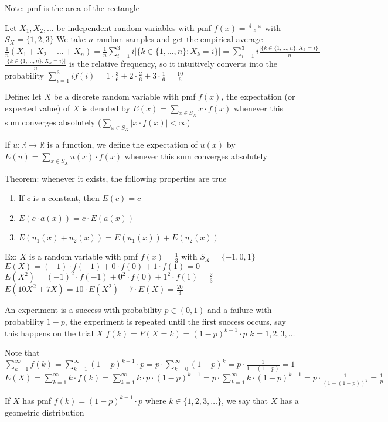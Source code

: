 \documentclass{article}
\begin{document}
Note: pmf is the area of the rectangle

Let $X_1,X_2,\dots$ be independent random variables with pmf $f(x)=\frac{4-x}{6}$ with $S_X=\{1,2,3\}$
We take $n$ random samples and get the empirical average $\frac{1}{n}(X_1+X_2+\dots+X_n)=\frac{1}{n}\sum_{i=1}^3i\lvert\{k\in\{1,\dots,n\}:X_k=i\}\rvert=\sum_{i=1}^3i\frac{\lvert\{k\in\{1,\dots,n\}:X_k=i\}\rvert}{n}$
$\frac{\lvert\{k\in\{1,\dots,n\}:X_k=i\}\rvert}{n}$ is the relative frequency, so it intuitively converts into the probability
$\sum_{i=1}^3if(i)=1\cdot\frac{3}{6}+2\cdot\frac{2}{6}+3\cdot\frac{1}{6}=\frac{10}{6}$

Define: let $X$ be a discrete random variable with pmf $f(x)$, the expectation (or expected value) of $X$ is denoted by $E(x)=\sum_{x\in S_X}x\cdot f(x)$ whenever this sum converges absolutely ($\sum_{x\in S_X}\lvert x\cdot f(x)\rvert<\infty$)

If $u:\mathbb{R}\to\mathbb{R}$ is a function, we define the expectation of $u(x)$ by $E(u)=\sum_{x\in S_X}u(x)\cdot f(x)$ whenever this sum converges absolutely

Theorem: whenever it exists, the following properties are true
\begin{enumerate}
    \item If $c$ is a constant, then $E(c)=c$
    \item $E(c\cdot a(x))=c\cdot E(a(x))$
    \item $E(u_1(x)+u_2(x))=E(u_1(x))+E(u_2(x))$
\end{enumerate}

Ex: $X$ is a random variable with pmf $f(x)=\frac{1}{3}$ with $S_X=\{-1,0,1\}$
$E(X)=(-1)\cdot f(-1)+0\cdot f(0)+1\cdot f(1)=0$
$E(X^2)=(-1)^2\cdot f(-1)+0^2\cdot f(0)+1^2\cdot f(1)=\frac{2}{3}$
$E(10X^2+7X)=10\cdot E(X^2)+7\cdot E(X)=\frac{20}{3}$

An experiment is a success with probability $p\in(0,1)$ and a failure with probability $1-p$, the experiment is repeated until the first success occurs, say this happens on the trial $X$
$f(k)=P(X=k)=(1-p)^{k-1}\cdot p$
$k=1,2,3,\dots$

Note that $\sum_{k=1}^\infty f(k)=\sum_{k=1}^\infty(1-p)^{k-1}\cdot p=p\cdot\sum_{k=0}^\infty(1-p)^k=p\cdot\frac{1}{1-(1-p)}=1$
$E(X)=\sum_{k=1}^\infty k\cdot f(k)=\sum_{k=1}^\infty k\cdot p\cdot(1-p)^{k-1}=p\cdot\sum_{k=1}^\infty k\cdot(1-p)^{k-1}=p\cdot\frac{1}{(1-(1-p))^2}=\frac{1}{p}$

If $X$ has pmf $f(k)=(1-p)^{k-1}\cdot p$ where $k\in\{1,2,3,\dots\}$, we say that $X$ has a geometric distribution
\end{document}
